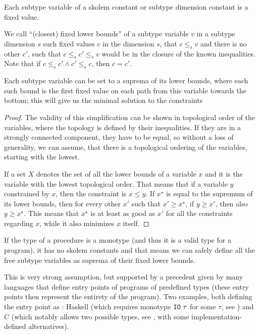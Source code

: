 \begin{defn}
    Each subtype variable of a skolem constant or subtype dimension constant is a fixed value.
\end{defn}

\begin{defn}
    We call ``(closest) fixed lower bounds'' of a subtype variable $v$ in a subtype dimension $s$ such fixed values $c$ in the dimension $s$, that $c \leq_s v$ and there is no other $c'$, such that $c \leq_s c' \leq_s v$ would be in the closure of the known inequalities. Note that if $c \leq_s c' \land c' \leq_s c$, then $c = c'$.
\end{defn}

\begin{lemma}Each subtype variable can be set to a suprema of its lower bounds, where each such bound is the first fixed value on each path from this variable towards the bottom; this will give us the minimal solution to the constraints
    \label{suprema_subtyping}

    \begin{proof}
        The validity of this simplification can be shown in topological order of the variables, where the topology is defined by their inequalities. If they are in a strongly connected component, they have to be equal, so without a loss of generality, we can assume, that there is a topological ordering of the variables, starting with the lowest.

        If a set $X$ denotes the set of all the lower bounds of a variable $x$ and it is the variable with the lowest topological order. That means that if a variable $y$ constrained by $x$, then the constraint is $x \leq y$. If $x^\star$ is equal to the supremum of its lower bounds, then for every other $x'$ such that $x' \geq x^\star$, if $y \geq x'$, then also $y \geq x^\star$. This means that $x^\star$ is at least as good as $x'$ for all the constraints regarding $x$, while it also minimizes $x$ itself.
    \end{proof}
\end{lemma}

\begin{cor}
    If the type of a procedure is a monotype (and thus it is a valid type for a program), it has no skolem constants and that means we can safely define all the free subtype variables as suprema of their fixed lower bounds.

    This is very strong assumption, but supported by a precedent given by many languages that define entry points of programs of predefined types (these entry points then represent the entirety of the program). Two examples, both defining the entry point as : Haskell (which requires monotype $\mathtt{IO}\ \tau$ for some $\tau$, see \cite{haskell2010}) and C (which notably allows two possible types, see \cite{cstandard2018}, with some implementation-defined alternatives).
\end{cor}

